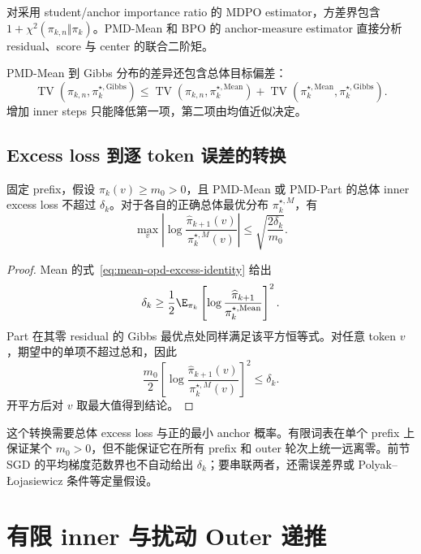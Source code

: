 对采用 student/anchor importance ratio 的 MDPO estimator，方差界包含 $1+\chi^2(\pi_{k,n}\Vert\pi_k)$。PMD-Mean 和 BPO 的 anchor-measure estimator 直接分析 residual、score 与 center 的联合二阶矩。

PMD-Mean 到 Gibbs 分布的差异还包含总体目标偏差：
\[
\operatorname{TV}(\pi_{k,n},\pi_k^{\star,\mathrm{Gibbs}})
\le\operatorname{TV}(\pi_{k,n},\pi_k^{\star,\mathrm{Mean}})
+\operatorname{TV}(\pi_k^{\star,\mathrm{Mean}},\pi_k^{\star,\mathrm{Gibbs}}).
\]
增加 inner steps 只能降低第一项，第二项由均值近似决定。

\subsection{Excess loss 到逐 token 误差的转换}

\begin{proposition}
固定 prefix，假设 $\pi_k(v)\geq m_0>0$，且 PMD-Mean 或 PMD-Part 的总体 inner excess loss 不超过 $\delta_k$。对于各自的正确总体最优分布 $\pi_k^{\star,M}$，有
\[
 \max_v\left|\log\frac{\widehat\pi_{k+1}(v)}{\pi_k^{\star,M}(v)}\right|
 \leq\sqrt{\frac{2\delta_k}{m_0}}.
\]
\end{proposition}

\begin{proof}
Mean 的式~\eqref{eq:mean-opd-excess-identity} 给出
\[
 \delta_k\geq\frac12\E_{\pi_k}
 \left[\log\frac{\widehat\pi_{k+1}}{\pi_k^{\star,\mathrm{Mean}}}\right]^2.
\]
Part 在其零 residual 的 Gibbs 最优点处同样满足该平方恒等式。对任意 token $v$，期望中的单项不超过总和，因此
\[
 \frac{m_0}{2}
 \left[\log\frac{\widehat\pi_{k+1}(v)}{\pi_k^{\star,M}(v)}\right]^2
 \leq\delta_k.
\]
开平方后对 $v$ 取最大值得到结论。
\end{proof}

这个转换需要总体 excess loss 与正的最小 anchor 概率。有限词表在单个 prefix 上保证某个 $m_0>0$，但不能保证它在所有 prefix 和 outer 轮次上统一远离零。前节 SGD 的平均梯度范数界也不自动给出 $\delta_k$；要串联两者，还需误差界或 Polyak--Łojasiewicz 条件等定量假设。

\section{有限 inner 与扰动 Outer 递推}

